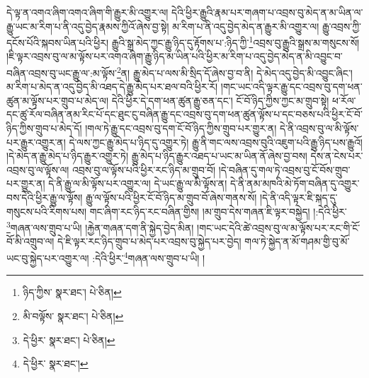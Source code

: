 དེ་ལྟ་ན་འགའ་ཞིག་འགའ་ཞིག་གི་རྒྱུར་མི་འགྱུར་ལ། དེའི་ཕྱིར་རྒྱུའི་རྣམ་པར་གཞག་པ་འབྲས་བུ་མེད་ན་མ་ཡིན་ལ་རྒྱུ་ཡང་མ་རིག་པ་ནི་འདུ་བྱེད་རྣམས་ཀྱིའོ་ཞེས་བྱ་སྟེ། མ་རིག་པ་ནི་འདུ་བྱེད་མེད་ན་རྒྱུར་མི་འགྱུར་ལ། རྒྱུ་འབྲས་ཀྱི་དངོས་པོའི་སྐབས་ཡིན་པའི་ཕྱིར། རྒྱུའི་སྒྲ་མེད་ཀྱང་རྒྱུ་ཉིད་དུ་རྟོགས་པ་:ཉིད་ཀྱི་\footnote{ཉིད་ཀྱིས་  སྣར་ཐང་།  པེ་ཅིན། }འབྲས་བུ་རྒྱུའི་སྒྲས་མ་གསུངས་སོ། །ཇི་ལྟར་འབྲས་བུ་ལ་མ་ལྟོས་པར་འགའ་ཞིག་རྒྱུ་ཉིད་མ་ཡིན་པའི་ཕྱིར་མ་རིག་པ་འདུ་བྱེད་མེད་ན་མི་འབྱུང་བ་བཞིན་འབྲས་བུ་ཡང་རྒྱུ་ལ་:མ་ལྟོས་\footnote{མི་བལྟོས་  སྣར་ཐང་།  པེ་ཅིན། }ན། རྒྱུ་མེད་པ་ལས་མི་སྲིད་དོ་ཞེས་བྱ་བ་ནི། དེ་མེད་འདུ་བྱེད་མི་འབྱུང་ཞིང་། མ་རིག་པ་མེད་ན་འདུ་བྱེད་མི་འཐད་དེ་རྒྱུ་མེད་པར་ཐལ་བའི་ཕྱིར་རོ། །གང་ཡང་འདི་ལྟར་རྒྱུ་དང་འབྲས་བུ་དག་ཕན་ཚུན་མ་ལྟོས་པར་གྲུབ་པ་མེད་ལ། དེའི་ཕྱིར་དེ་དག་ཕན་ཚུན་རྒྱུ་ཅན་དང་། ངོ་བོ་ཉིད་ཀྱིས་ཀྱང་མ་གྲུབ་སྟེ། ཕ་རོལ་དང་ཚུ་རོལ་བཞིན་ནམ་རིང་པོ་དང་ཐུང་ངུ་བཞིན་རྒྱུ་དང་འབྲས་བུ་དག་ཕན་ཚུན་ལྟོས་པ་དང་བཅས་པའི་ཕྱིར་ངོ་བོ་ཉིད་ཀྱིས་གྲུབ་པ་མེད་དོ། །གལ་ཏེ་རྒྱུ་དང་འབྲས་བུ་དག་ངོ་བོ་ཉིད་ཀྱིས་གྲུབ་པར་གྱུར་ན། དེ་ནི་འབྲས་བུ་ལ་མི་ལྟོས་པར་རྒྱུར་འགྱུར་ན། དེ་ལས་ཀྱང་རྒྱུ་མེད་པ་ཉིད་དུ་འགྱུར་ཏེ། རྒྱུ་ནི་གང་ལས་འབྲས་བུའི་འཇུག་པའི་རྒྱུ་ཉིད་པས་རྒྱུའོ། །དེ་མེད་ན་རྒྱུ་མེད་པ་ཉིད་རྒྱུར་འགྱུར་ཏེ། རྒྱུ་མེད་པ་ཉིད་རྒྱུར་འཐད་པ་ཡང་མ་ཡིན་ནོ་ཞེས་བྱ་བས། དེས་ན་ངེས་པར་འབྲས་བུ་ལ་ལྟོས་ལ། འབྲས་བུ་ལ་ལྟོས་པའི་ཕྱིར་རང་ཉིད་མ་གྲུབ་བོ། །དེ་བཞིན་དུ་གལ་ཏེ་འབྲས་བུ་ངོ་བོས་གྲུབ་པར་གྱུར་ན། དེ་ནི་རྒྱུ་ལ་མི་ལྟོས་པར་འགྱུར་ལ། དེ་ཡང་རྒྱུ་ལ་མི་ལྟོས་ན། དེ་ནི་ནམ་མཁའི་མེ་ཏོག་བཞིན་དུ་འགྱུར་བས་དེའི་ཕྱིར་རྒྱུ་ལ་ལྟོས། རྒྱུ་ལ་ལྟོས་པའི་ཕྱིར་ངོ་བོ་ཉིད་མ་གྲུབ་བོ་ཞེས་གནས་སོ། །དེ་ནི་འདི་ལྟར་ཇི་སྐད་དུ་གསུངས་པའི་རིགས་པས། གང་ཞིག་རང་ཉིད་རང་བཞིན་གྱིས། །མ་གྲུབ་དེས་གཞན་ཇི་ལྟར་བསྐྱེད། །:དེའི་ཕྱིར་\footnote{དེ་ཕྱིར་  སྣར་ཐང་།  པེ་ཅིན། }གཞན་ལས་གྲུབ་པ་ཡི། །རྐྱེན་གཞན་དག་ནི་སྐྱེད་བྱེད་མིན། །གང་ཡང་དེའི་ཚེ་འབྲས་བུ་ལ་མ་ལྟོས་པར་རང་གི་ངོ་བོ་མི་འགྲུབ་ལ། དེ་ཇི་ལྟར་རང་ཉིད་གྲུབ་པ་མེད་པར་འབྲས་བུ་སྐྱེད་པར་བྱེད། གལ་ཏེ་སྐྱེད་ན་མོ་གཤམ་གྱི་བུ་མོ་ཡང་བུ་སྐྱེད་པར་འགྱུར་ལ། :དེའི་ཕྱིར་\footnote{དེ་ཕྱིར་  སྣར་ཐང་། }གཞན་ལས་གྲུབ་པ་ཡི། །
